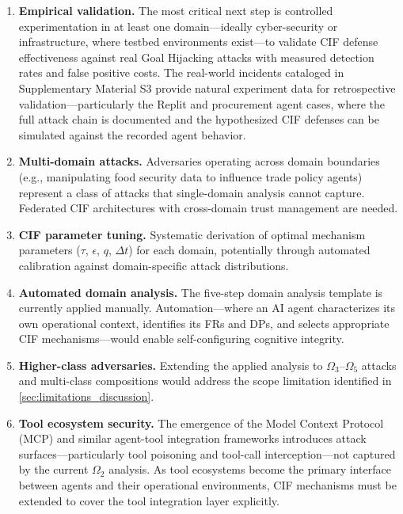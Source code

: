 \documentclass[
]{article}
\begin{document}
\begin{enumerate}
\def\labelenumi{\arabic{enumi}.}
\item
  \textbf{Empirical validation.} The most critical next step is
  controlled experimentation in at least one domain---ideally
  cyber-security or infrastructure, where testbed environments
  exist---to validate CIF defense effectiveness against real Goal
  Hijacking attacks with measured detection rates and false positive
  costs. The real-world incidents cataloged in Supplementary Material S3
  provide natural experiment data for retrospective
  validation---particularly the Replit and procurement agent cases,
  where the full attack chain is documented and the hypothesized CIF
  defenses can be simulated against the recorded agent behavior.
\item
  \textbf{Multi-domain attacks.} Adversaries operating across domain
  boundaries (e.g., manipulating food security data to influence trade
  policy agents) represent a class of attacks that single-domain
  analysis cannot capture. Federated CIF architectures with cross-domain
  trust management are needed.
\item
  \textbf{CIF parameter tuning.} Systematic derivation of optimal
  mechanism parameters (\(\tau\), \(\epsilon\), \(q\), \(\Delta t\)) for
  each domain, potentially through automated calibration against
  domain-specific attack distributions.
\item
  \textbf{Automated domain analysis.} The five-step domain analysis
  template is currently applied manually. Automation---where an AI agent
  characterizes its own operational context, identifies its FRs and DPs,
  and selects appropriate CIF mechanisms---would enable self-configuring
  cognitive integrity.
\item
  \textbf{Higher-class adversaries.} Extending the applied analysis to
  \(\Omega_3\)--\(\Omega_5\) attacks and multi-class compositions would
  address the scope limitation identified in
  \cref{sec:limitations_discussion}.
\item
  \textbf{Tool ecosystem security.} The emergence of the Model Context
  Protocol (MCP) and similar agent-tool integration frameworks
  introduces attack surfaces---particularly tool poisoning and tool-call
  interception---not captured by the current \(\Omega_2\) analysis. As
  tool ecosystems become the primary interface between agents and their
  operational environments, CIF mechanisms must be extended to cover the
  tool integration layer explicitly.
\end{enumerate}
\end{document}
